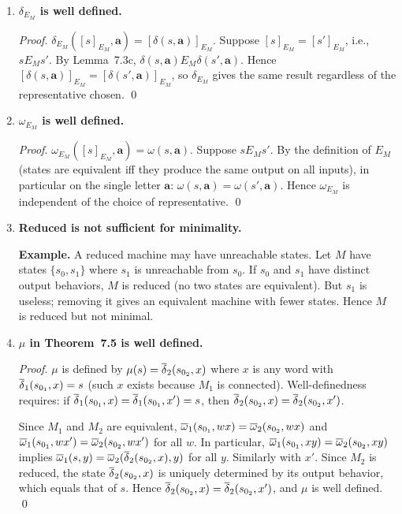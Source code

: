 \begin{enumerate}[{7.}1.]
Formally: add $\delta(s_k,\pmb{r})=s_0$ and $\omega(s_k,\pmb{r})=\pmb{a}$ for each state $s_k$ in the vending machine.

\item \textbf{$\delta_{E_M}$ is well defined.}

\begin{proof}
$\delta_{E_M}([s]_{E_M},\pmb{a})=[\delta(s,\pmb{a})]_{E_M}$.  Suppose $[s]_{E_M}=[s']_{E_M}$, i.e., $s E_M s'$.  By Lemma~7.3c, $\delta(s,\pmb{a}) E_M \delta(s',\pmb{a})$.  Hence $[\delta(s,\pmb{a})]_{E_M}=[\delta(s',\pmb{a})]_{E_M}$, so $\delta_{E_M}$ gives the same result regardless of the representative chosen. \qed
\end{proof}

\item \textbf{$\omega_{E_M}$ is well defined.}

\begin{proof}
$\omega_{E_M}([s]_{E_M},\pmb{a})=\omega(s,\pmb{a})$.  Suppose $s E_M s'$.  By the definition of $E_M$ (states are equivalent iff they produce the same output on all inputs), in particular on the single letter $\pmb{a}$: $\omega(s,\pmb{a})=\omega(s',\pmb{a})$.  Hence $\omega_{E_M}$ is independent of the choice of representative. \qed
\end{proof}

\item \textbf{Reduced is not sufficient for minimality.}

\textbf{Example.}  A reduced machine may have unreachable states.  Let $M$ have states $\{s_0,s_1\}$ where $s_1$ is unreachable from $s_0$.  If $s_0$ and $s_1$ have distinct output behaviors, $M$ is reduced (no two states are equivalent).  But $s_1$ is useless; removing it gives an equivalent machine with fewer states.  Hence $M$ is reduced but not minimal.

\item \textbf{$\mu$ in Theorem~7.5 is well defined.}

\begin{proof}
$\mu$ is defined by $\mu(s)=\overline{\delta}_2(s_{0_2},x)$ where $x$ is any word with $\overline{\delta}_1(s_{0_1},x)=s$ (such $x$ exists because $M_1$ is connected).  Well-definedness requires: if $\overline{\delta}_1(s_{0_1},x)=\overline{\delta}_1(s_{0_1},x')=s$, then $\overline{\delta}_2(s_{0_2},x)=\overline{\delta}_2(s_{0_2},x')$.

Since $M_1$ and $M_2$ are equivalent, $\overline{\omega}_1(s_{0_1},wx)=\overline{\omega}_2(s_{0_2},wx)$ and $\overline{\omega}_1(s_{0_1},wx')=\overline{\omega}_2(s_{0_2},wx')$ for all $w$.  In particular, $\overline{\omega}_1(s_{0_1},xy)=\overline{\omega}_2(s_{0_2},xy)$ implies $\overline{\omega}_1(s,y)=\overline{\omega}_2(\overline{\delta}_2(s_{0_2},x),y)$ for all $y$.  Similarly with $x'$.  Since $M_2$ is reduced, the state $\overline{\delta}_2(s_{0_2},x)$ is uniquely determined by its output behavior, which equals that of $s$.  Hence $\overline{\delta}_2(s_{0_2},x)=\overline{\delta}_2(s_{0_2},x')$, and $\mu$ is well defined. \qed
\end{proof}


\end{enumerate}

